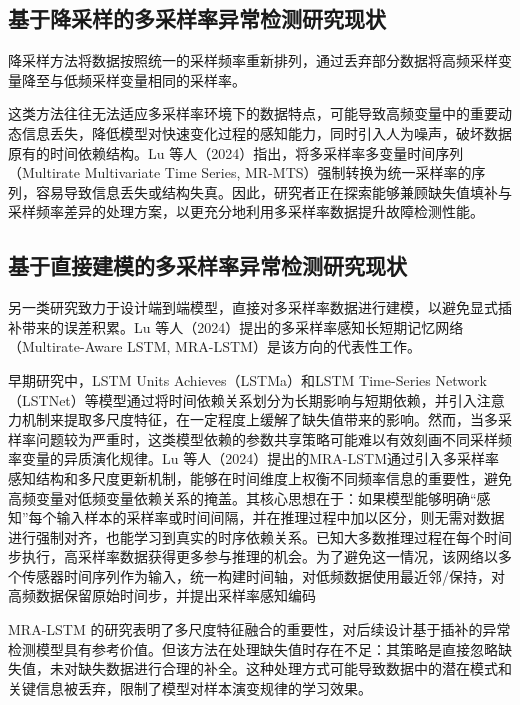 \documentclass[bachelor, vlined]{DissertUESTC}
\begin{document}
    \subsection{基于降采样的多采样率异常检测研究现状}

    降采样方法将数据按照统一的采样频率重新排列，通过丢弃部分数据将高频采样变量降至与低频采样变量相同的采样率。

    这类方法往往无法适应多采样率环境下的数据特点，可能导致高频变量中的重要动态信息丢失，降低模型对快速变化过程的感知能力，同时引入人为噪声，破坏数据原有的时间依赖结构。Lu 等人（2024）指出，将多采样率多变量时间序列（Multirate Multivariate Time Series, MR-MTS）强制转换为统一采样率的序列，容易导致信息丢失或结构失真。因此，研究者正在探索能够兼顾缺失值填补与采样频率差异的处理方案，以更充分地利用多采样率数据提升故障检测性能。

    \subsection{基于直接建模的多采样率异常检测研究现状}

    另一类研究致力于设计端到端模型，直接对多采样率数据进行建模，以避免显式插补带来的误差积累。Lu 等人（2024）提出的多采样率感知长短期记忆网络（Multirate-Aware LSTM, MRA-LSTM）是该方向的代表性工作。

    早期研究中，LSTM Units Achieves（LSTMa）和LSTM Time-Series Network（LSTNet）等模型通过将时间依赖关系划分为长期影响与短期依赖，并引入注意力机制来提取多尺度特征，在一定程度上缓解了缺失值带来的影响。然而，当多采样率问题较为严重时，这类模型依赖的参数共享策略可能难以有效刻画不同采样频率变量的异质演化规律。Lu 等人（2024）提出的MRA-LSTM通过引入多采样率感知结构和多尺度更新机制，能够在时间维度上权衡不同频率信息的重要性，避免高频变量对低频变量依赖关系的掩盖。其核心思想在于：如果模型能够明确“感知”每个输入样本的采样率或时间间隔，并在推理过程中加以区分，则无需对数据进行强制对齐，也能学习到真实的时序依赖关系。已知大多数推理过程在每个时间步执行，高采样率数据获得更多参与推理的机会。为了避免这一情况，该网络以多个传感器时间序列作为输入，统一构建时间轴，对低频数据使用最近邻/保持，对高频数据保留原始时间步，并提出采样率感知编码

    MRA-LSTM 的研究表明了多尺度特征融合的重要性，对后续设计基于插补的异常检测模型具有参考价值。但该方法在处理缺失值时存在不足：其策略是直接忽略缺失值，未对缺失数据进行合理的补全。这种处理方式可能导致数据中的潜在模式和关键信息被丢弃，限制了模型对样本演变规律的学习效果。
\end{document}
